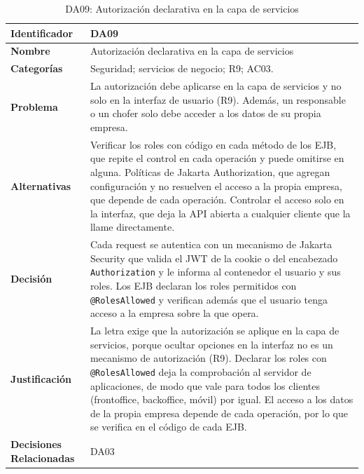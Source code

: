 \begin{table}[H]
    \small
    \centering
    \caption{DA09: Autorización declarativa en la capa de servicios}
    \label{tab:da09}
    \begin{tabular}{|p{4.1cm}|p{11.7cm}|}
        \hline
            \textbf{Identificador} & DA09 \\
        \hline
            \textbf{Nombre} & Autorización declarativa en la capa de servicios \\
        \hline
            \textbf{Categorías} & Seguridad; servicios de negocio; R9; AC03. \\
        \hline
            \textbf{Problema} & La autorización debe aplicarse en la capa de servicios y no solo en la interfaz de usuario (R9). Además, un responsable o un chofer solo debe acceder a los datos de su propia empresa. \\
        \hline
            \textbf{Alternativas} & Verificar los roles con código en cada método de los EJB, que repite el control en cada operación y puede omitirse en alguna. Políticas de Jakarta Authorization, que agregan configuración y no resuelven el acceso a la propia empresa, que depende de cada operación. Controlar el acceso solo en la interfaz, que deja la API abierta a cualquier cliente que la llame directamente. \\
        \hline
            \textbf{Decisión} & Cada request se autentica con un mecanismo de Jakarta Security que valida el JWT de la cookie o del encabezado \texttt{Authorization} y le informa al contenedor el usuario y sus roles. Los EJB declaran los roles permitidos con \texttt{@RolesAllowed} y verifican además que el usuario tenga acceso a la empresa sobre la que opera. \\
        \hline
            \textbf{Justificación} & La letra exige que la autorización se aplique en la capa de servicios, porque ocultar opciones en la interfaz no es un mecanismo de autorización (R9). Declarar los roles con \texttt{@RolesAllowed} deja la comprobación al servidor de aplicaciones, de modo que vale para todos los clientes (frontoffice, backoffice, móvil) por igual. El acceso a los datos de la propia empresa depende de cada operación, por lo que se verifica en el código de cada EJB. \\
        \hline
            \textbf{Decisiones Relacionadas} & DA03 \\
        \hline
    \end{tabular}
\end{table}

